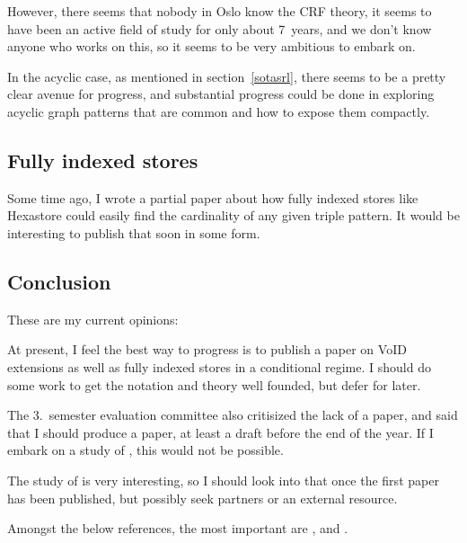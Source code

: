 However, there seems that nobody in Oslo know the CRF theory, it seems
to have been an active field of study for only about 7~years, and we don't
know anyone who works on this, so it seems to be very ambitious to
embark on. 

In the acyclic case, as mentioned in section~\ref{sotasrl}, there
seems to be a pretty clear avenue for progress, and substantial
progress could be done in exploring acyclic graph patterns that are
common and how to expose them compactly.


\subsection{Fully indexed stores}

Some time ago, I wrote a partial paper about how fully indexed stores
like Hexastore \cite{hexastore} could easily find the cardinality of
any given triple pattern. It would be interesting to publish that soon
in some form.

\subsection{Conclusion}

These are my current opinions: 

At present, I feel the best way to progress is to publish a paper on
VoID extensions as well as fully indexed stores in a conditional
regime. I should do some work to get the notation and theory well
founded, but defer \SRL{} for later.

The 3.~semester evaluation committee also critisized the lack of a
paper, and said that I should produce a paper, at least a draft before
the end of the year. If I embark on a study of \SRL{}, this would not
be possible.

The study of \SRL{} is very interesting, so I should look into that
once the first paper has been published, but possibly seek partners or
an external resource. 

Amongst the below references, the most important are
\cite{selectivityPRM}, \cite{Lin:2011:LRB:2063016.2063042} and
\cite{splendid}.
